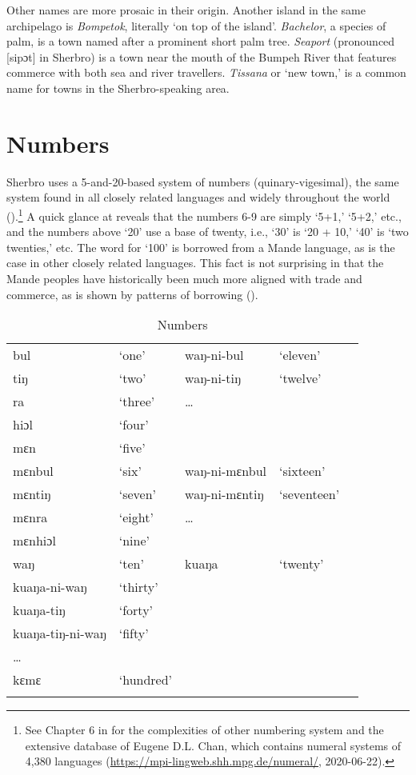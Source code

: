 Other names are more prosaic in their origin. Another island in the same archipelago is \textit{Bompetok}, literally ‘on top of the island'. \textit{Bachelor}, a species of palm, is a town named after a prominent short palm tree. \textit{Seaport} (pronounced [sipɔt] in Sherbro) is a town near the mouth of the Bumpeh River that features commerce with both sea and river travellers. \textit{Tissana} or ‘new town,' is a common name for towns in the Sherbro-speaking area.

\section{Numbers}
\label{sec:3.7}\hypertarget{Toc115517771}{}
Sherbro uses a 5-and-20-based system of numbers (quinary-vigesimal), the same system found in all closely related languages and widely throughout the world (\citealt{Nykl1926}).\footnote{See Chapter 6 in \citet{Harrison2007} for the complexities of other numbering system and the extensive database of Eugene D.L. Chan, which contains numeral systems of 4,380 languages (\url{https://mpi-lingweb.shh.mpg.de/numeral/}, 2020-06-22).} A quick glance at  reveals that the numbers 6-9 are simply ‘5+1,' ‘5+2,' etc., and the numbers above ‘20' use a base of twenty, i.e., ‘30' is ‘20 + 10,' ‘40' is ‘two twenties,' etc. The word for ‘100' is borrowed from a Mande language, as is the case in other closely related languages. This fact is not surprising in that the Mande peoples have historically been much more aligned with trade and commerce, as is shown by patterns of borrowing (\citealt{Childs2002a}).

\begin{table}
\caption{\label{tab:wordcat:20}Numbers}

\begin{tabular}{lllll}
\lsptoprule
bul & ‘one' & waŋ-ni-bul & ‘eleven'\\
tiŋ & ‘two' & waŋ-ni-tiŋ & ‘twelve'\\
ra & ‘three' &  … & \\
hiɔl & ‘four' &  & \\
mɛn & ‘five' &  & \\
mɛnbul & ‘six' & waŋ-ni-mɛnbul & ‘sixteen'\\
mɛntiŋ & ‘seven' & waŋ-ni-mɛntiŋ & ‘seventeen'\\
mɛnra & ‘eight' & …\\
mɛnhiɔl & ‘nine'\\
waŋ & ‘ten' & kuaŋa & ‘twenty'\\
\tablevspace
kuaŋa-ni-waŋ & ‘thirty'\\
kuaŋa-tiŋ & ‘forty'\\
kuaŋa-tiŋ-ni-waŋ & ‘fifty'\\
… \\
kɛmɛ & ‘hundred'\\
\lspbottomrule
\end{tabular}
\end{table}

